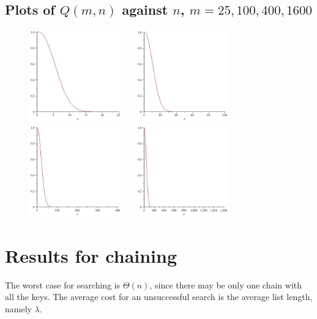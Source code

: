 \subsection{Plots of $Q(m, n)$ against $n$, $m=25,100,400,1600$}
\begin{figure}[htb]
\centering
\includegraphics[width=4cm]{figs/birthday25.jpg}
$\quad$
\includegraphics[width=4cm]{figs/birthday100.jpg}\\
\includegraphics[width=4cm]{figs/birthday400.jpg}
$\quad$
\includegraphics[width=4cm]{figs/birthday1600.jpg}
\end{figure}

\section{Results for chaining}
The worst case for searching is $\Theta(n)$, since there may be only one chain with all the keys. 
The average cost for an unsuccessful search is the average list length, namely $\lambda$.


